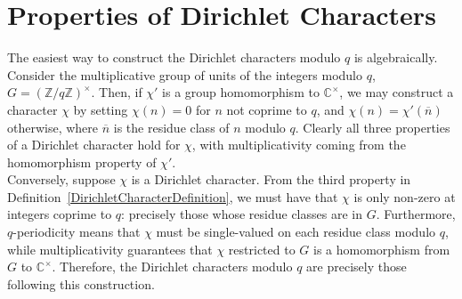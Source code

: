 \section{Properties of Dirichlet Characters}
The easiest way to construct the Dirichlet characters modulo $q$ is algebraically. Consider the multiplicative group of units of the integers modulo $q$, $G = (\mathbb{Z}/q\mathbb{Z})^{\times}$. Then, if $\chi'$ is a group homomorphism to $\mathbb{C}^{\times}$, we may construct a character $\chi$ by setting $\chi(n)=0$ for $n$ not coprime to $q$, and $\chi(n) = \chi'(\overline{n})$ otherwise, where $\overline{n}$ is the residue class of $n$ modulo $q$. Clearly all three properties of a Dirichlet character hold for $\chi$, with multiplicativity coming from the homomorphism property of $\chi'$. \\

Conversely, suppose $\chi$ is a Dirichlet character. From the third property in Definition~\ref{DirichletCharacterDefinition}, we must have that $\chi$ is only non-zero at integers coprime to $q$: precisely those whose residue classes are in $G$. Furthermore, $q$-periodicity means that $\chi$ must be single-valued on each residue class modulo $q$, while multiplicativity guarantees that $\chi$ restricted to $G$ is a homomorphism from $G$ to $\mathbb{C}^{\times}$. Therefore, the Dirichlet characters modulo $q$ are precisely those following this construction. \\

